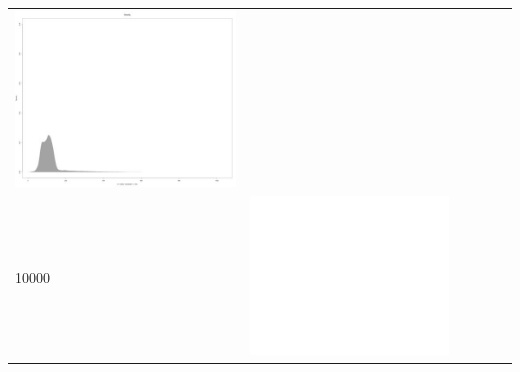 \begin{table}[htbp]
{\begin{tabular}{l | ccccc}
\begin{minipage}{.15\textwidth}
     			 	\includegraphics[width=\linewidth]{images/mema-dens-graph/I13}
    				 \end{minipage}\\
		10000  &	 \begin{minipage}{.15\textwidth}
     			 	\includegraphics[width=\linewidth]{images/mema-dens-graph/I5}
    				 \end{minipage}
    			   &	 \begin{minipage}{.15\textwidth}

\end{minipage}
\end{tabular}}
\end{table}
